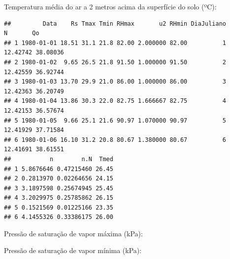 \documentclass[
]{book}
\newenvironment{Shaded}{\begin{snugshade}}{\end{snugshade}}
\newcommand{\DecValTok}[1]{\textcolor[rgb]{0.00,0.00,0.81}{#1}}
\newcommand{\FloatTok}[1]{\textcolor[rgb]{0.00,0.00,0.81}{#1}}
\newcommand{\KeywordTok}[1]{\textcolor[rgb]{0.13,0.29,0.53}{\textbf{#1}}}
\newcommand{\NormalTok}[1]{#1}
\newcommand{\OperatorTok}[1]{\textcolor[rgb]{0.81,0.36,0.00}{\textbf{#1}}}
\newcommand{\StringTok}[1]{\textcolor[rgb]{0.31,0.60,0.02}{#1}}
\begin{document}
Temperatura média do ar a 2 metros acima da superfície do solo (ºC):

\begin{Shaded}
\end{Shaded}

\begin{verbatim}
##         Data    Rs Tmax Tmin RHmax       u2 RHmin DiaJuliano        N       Qo
## 1 1980-01-01 18.51 31.1 21.8 82.00 2.000000 82.00          1 12.42742 38.08036
## 2 1980-01-02  9.65 26.5 21.8 91.50 1.000000 91.50          2 12.42559 36.92744
## 3 1980-01-03 13.70 29.9 21.0 86.00 1.000000 86.00          3 12.42363 36.20749
## 4 1980-01-04 13.86 30.3 22.0 82.75 1.666667 82.75          4 12.42153 36.57674
## 5 1980-01-05  9.66 25.1 21.6 90.97 1.070000 90.97          5 12.41929 37.71584
## 6 1980-01-06 16.10 31.2 20.8 80.67 1.380000 80.67          6 12.41691 38.61551
##           n        n.N  Tmed
## 1 5.8676646 0.47215460 26.45
## 2 0.2813970 0.02264656 24.15
## 3 3.1897598 0.25674945 25.45
## 4 3.2029975 0.25785862 26.15
## 5 0.1521569 0.01225166 23.35
## 6 4.1455326 0.33386175 26.00
\end{verbatim}

Pressão de saturação de vapor máxima (kPa):

\begin{Shaded}
\end{Shaded}

Pressão de saturação de vapor mínima (kPa):

\begin{Shaded}
\end{Shaded}
\end{document}
